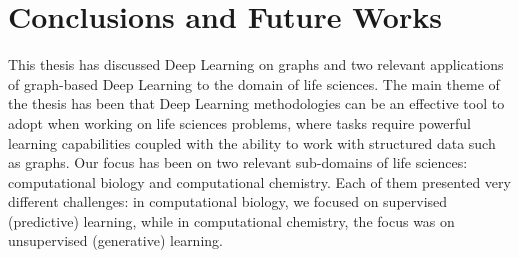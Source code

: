 \chapter{Conclusions and Future Works} %
\label{ch:conclusions}

This thesis has discussed Deep Learning on graphs and two relevant applications of graph-based Deep Learning to the domain of life sciences. The main theme of the thesis has been that Deep Learning methodologies can be an effective tool to adopt when working on life sciences problems, where tasks require powerful learning capabilities coupled with the ability to work with structured data such as graphs. Our focus has been on two relevant sub-domains of life sciences: computational biology and computational chemistry. Each of them presented very different challenges: in computational biology, we focused on supervised (predictive) learning, while in computational chemistry, the focus was on unsupervised (generative) learning.

